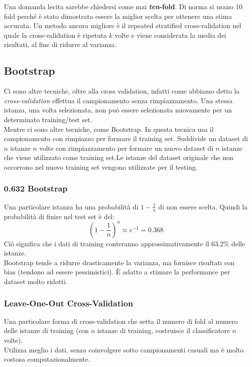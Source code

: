Una domanda lecita sarebbe chiedersi come mai \textbf{\textit{ten}-fold}. Di norma si usano 10 fold perché è stato dimostrata essere la miglior scelta per ottenere una stima accurata. Un metodo ancora migliore è il repeated stratified cross-validation nel quale la cross-validation è ripetuta $k$ volte e viene considerata la media dei risultati, al fine di ridurre al varianza.\\

\subsection{Bootstrap}
Ci sono altre tecniche, oltre alla cross validation, infatti come abbiamo detto la \textit{cross-validation} effettua il campionamento senza rimpiazzamento. Una stessa istanza, una volta selezionata, non può essere selezionata nuovamente per un determinato training/test set.\\
Mentre ci sono altre tecniche, come Bootstrap. In questa tecnica usa il campionamento con rimpiazzo per formare il training set. Suddivide un dataset di $n$ istanze $n$ volte con rimpiazzamento per formare un nuovo dataset di $n$ istanze che viene utilizzato come training set.Le istanze del dataset originale che non occorrono nel nuovo training set vengono utilizzate per il testing.\\

\subsubsection{0.632 Bootstrap}
Una particolare istanza ha una probabilità di $1 - \displaystyle \frac{1}{n}$ di non essere scelta.
Quindi la probabilità di finire nel test set è del: \[\left( 1- \displaystyle \frac{1}{n} \right)^n \approx e^{-1} = 0.368\]
Ciò significa che i dati di training conteranno approssimativamente il $63.2\%$ delle istanze.\\

Bootstrap tende a ridurre drasticamente la varianza, ma fornisce risultati con bias (tendono ad essere pessimistici).
È adatto a stimare la performance per dataset molto ridotti.

\subsubsection{Leave-One-Out Cross-Validation}
Una particolare forma di cross-validation che setta il numero di fold al numero delle istanze di training (con $n$ istanze di training, costruisce il classificatore $n$ volte). \\
Utilizza meglio i dati, senza coinvolgere sotto campionamenti casuali ma è molto costosa computazionalmente.\\

